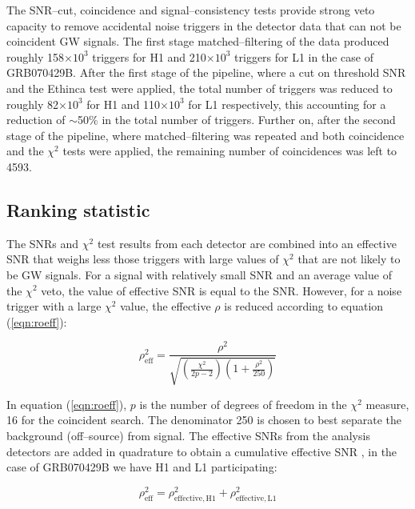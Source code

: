 The SNR--cut, coincidence and signal--consistency tests provide strong veto capacity to remove accidental noise triggers in the detector data that can not be coincident GW signals. The first stage matched--filtering of the data produced roughly 158$\times 10^3$ triggers for H1 and 210$\times 10^3$ triggers for L1 in the case of GRB070429B. After the first stage of the pipeline, where a cut on threshold SNR and the Ethinca test were applied, the total number of triggers was reduced to roughly 82$\times 10^3$ for H1 and 110$\times 10^3$ for L1 respectively, this accounting for a reduction of $\sim$50$\%$ in the total number of triggers. Further on, after the second stage of the pipeline, where matched--filtering was repeated and both coincidence and the $\chi^2$ tests were applied, the remaining number of coincidences was left to 4593. 

\subsection{Ranking statistic}
The SNRs and  $\chi^2$ test results from each detector are combined into an effective SNR that weighs less those triggers with large values of $\chi^2$ that are not likely to be GW signals. For a signal with relatively small SNR and an average value of the $\chi^2$ veto, the value of effective SNR is equal to the SNR. However, for a noise trigger with a large $\chi^2$ value, the effective $\rho$ is reduced according to equation (\ref{eqn:roeff}):

\begin{equation}
\rho^2_{\mathrm{eff}} = \frac{\rho^2}{\sqrt {( \frac {\chi^2}{2p-2})(1+ \frac {\rho^2}{250})}}
\label{eqn:roeff}
\end{equation}

\noindent In equation (\ref{eqn:roeff}), $p$ is the number of degrees of freedom in the $\chi^2$ measure, 16 for the coincident search. The denominator 250 is chosen to best separate the background (off--source) from signal. The effective SNRs from the analysis detectors are added in quadrature to obtain a cumulative effective SNR \cite{Abbott:2009tt,Abadie:2010yb}, in the case of GRB070429B we have H1 and L1 participating:

\begin{equation}
\rho^2_{\mathrm{eff}} = \rho^2_{\mathrm{effective, H1}} + \rho^2_{\mathrm{effective, L1}}
\end{equation}

